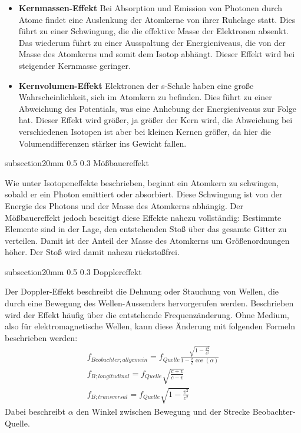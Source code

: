 \documentclass[german, %
parskip=full, %
bibliography=totoc, %
]{scrartcl}
\makeatletter
\renewcommand\subsection{\@startsection 
   {subsection}{2}{0mm}%
   {0.5\baselineskip}%
   {0.3\baselineskip}%
   {\bfseries\sffamily\large}%
   }
\makeatother
\begin{document}
\begin{itemize}
\item \textbf{Kernmassen-Effekt} Bei Absorption und Emission von Photonen durch Atome findet eine Auslenkung der Atomkerne von ihrer Ruhelage statt. Dies führt zu einer Schwingung, die die effektive Masse der Elektronen absenkt. Das wiederum führt zu einer Ausspaltung der Energieniveaus, die von der Masse des Atomkerns und somit dem Isotop abhängt. Dieser Effekt wird bei steigender Kernmasse geringer.
\item \textbf{Kernvolumen-Effekt} Elektronen der s-Schale haben eine große Wahrscheinlichkeit, sich im Atomkern zu befinden. Dies führt zu einer Abweichung des Potentials, was eine Anhebung der Energieniveaus zur Folge hat. Dieser Effekt wird größer, ja größer der Kern wird, die Abweichung bei verschiedenen Isotopen ist aber bei kleinen Kernen größer, da hier die Volumendifferenzen stärker ins Gewicht fallen.
\end{itemize}

\subsection{Mößbauereffekt}

Wie unter Isotopeneffekte beschrieben, beginnt ein Atomkern zu schwingen, sobald er ein Photon emittiert oder absorbiert. Diese Schwingung ist von der Energie des Photons und der Masse des Atomkerns abhängig. Der Mößbauereffekt jedoch beseitigt diese Effekte nahezu vollständig: Bestimmte Elemente sind in der Lage, den entstehenden Stoß über das gesamte Gitter zu verteilen. Damit ist der Anteil der Masse des Atomkerns um Größenordnungen höher. Der Stoß wird damit nahezu rückstoßfrei.

\subsection{Dopplereffekt}

Der Doppler-Effekt beschreibt die Dehnung oder Stauchung von Wellen, die durch eine Bewegung des Wellen-Aussenders hervorgerufen werden. Beschrieben wird der Effekt häufig über die entstehende Frequenzänderung. Ohne Medium, also für elektromagnetische Wellen, kann diese Änderung mit folgenden Formeln beschrieben werden:
\begin{align}
f_{Beobachter;allgemein} = f_{Quelle} \frac{\sqrt{1 - \frac{v^2}{c^2}}}{1 - \frac{v}{c} \cos (\alpha)} \\
f_{B; longitudinal} = f_{Quelle} \sqrt{\frac{c + v}{c - v}} \\
f_{B; transversal} = f_{Quelle} \sqrt{1 - \frac{v^2}{c^2}}
\end{align}
Dabei beschreibt $\alpha$ den Winkel zwischen Bewegung und der Strecke Beobachter-Quelle.
\end{document}
